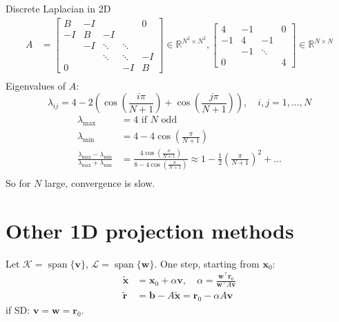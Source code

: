 \begin{example}{Discrete Laplacian in 2D}{}
    \begin{align*}
        A & =
        \begin{bmatrix}
            B  & -I &        &        & 0  \\
            -I & B  & -I     &        &    \\
               & -I & \ddots & \ddots &    \\
               &    & \ddots & \ddots & -I \\
            0  &    &        & -I     & B
        \end{bmatrix} \in \mathbb{R}^{N^2 \times N^2},
        \begin{bmatrix}
            4  & -1 &        & 0 \\
            -1 & 4  & -1     &   \\
               & -1 & \ddots &   \\
            0  &    &        & 4
        \end{bmatrix} \in \mathbb{R}^{N \times N} \\
    \end{align*}
    Eigenvalues of $A$:
    \[
        \lambda_{ij} = 4 - 2\left(\cos\left(\frac{i \pi}{N+1}\right) + \cos\left(\frac{j \pi}{N+1}\right)\right), \quad i, j = 1, \ldots, N
    \]
    \begin{align*}
        \lambda_{\max}                                                          & = 4 \text{ if } N \text{ odd}                                                                                                                \\
        \lambda_{\min}                                                          & = 4 - 4\cos\left(\frac{\pi}{N+1}\right)                                                                                                      \\
        \frac{\lambda_{\max} - \lambda_{\min}}{\lambda_{\max} + \lambda_{\min}} & = \frac{4\cos\left(\frac{\pi}{N+1}\right)}{8 - 4\cos\left(\frac{\pi}{N+1}\right)} \approx 1 - \frac12\left(\frac{\pi}{N+1}\right)^2 + \ldots \\
    \end{align*}
    So for $N$ large, convergence is slow.
\end{example}

\section*{Other 1D projection methods}
Let $\mathcal{K} = \operatorname{span}\{\mathbf{v}\}$, $\mathcal{L} = \operatorname{span}\{\mathbf{w}\}$.
One step, starting from $\mathbf{x}_0$:
\begin{align*}
    \tilde{\mathbf{x}} & = \mathbf{x}_0 + \alpha \mathbf{v}, \quad \alpha = \frac{\mathbf{w}^{\top} \mathbf{r}_0}{\mathbf{w}^{\top} A \mathbf{v}} \\
    \tilde{\mathbf{r}} & = \mathbf{b} - A\tilde{\mathbf{x}} = \mathbf{r}_0 - \alpha A \mathbf{v}
\end{align*}
if SD: $\mathbf{v} = \mathbf{w} = \mathbf{r}_0$.


